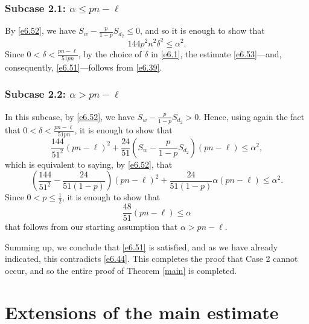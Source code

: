 \documentclass[10pt]{amsart}
\theoremstyle{remark}
\newcommand{\mik}{\leqslant}
\begin{document}
\subsubsection*{Subcase 2.1: $\alpha\mik pn-\ell$} By \eqref{e6.52},
we have $S_w-\frac{p}{1-p}S_{d_2}\mik 0$, and so it is enough to show that
\begin{equation} \label{e6.53}
144p^2n^2\delta^2 \mik \alpha^2.
\end{equation}
Since $0<\delta<\frac{pn-\ell}{51pn}$, by the choice of $\delta$ in \eqref{e6.1},
the estimate \eqref{e6.53}---and, consequently, \eqref{e6.51}---follows from \eqref{e6.39}.

\subsubsection*{Subcase 2.2: $\alpha> pn-\ell$} In this subcase, by \eqref{e6.52}, we have $S_w-\frac{p}{1-p}S_{d_2}>0$.
Hence, using again the fact that $0<\delta<\frac{pn-\ell}{51pn}$, it is enough to show that
\begin{equation} \label{e6.54}
\frac{144}{51^2}(pn-\ell)^2 + \frac{24}{51}\left(S_w-\frac{p}{1-p}S_{d_2}\right)(pn-\ell)\mik \alpha^2,
\end{equation}
which is equivalent to saying, by \eqref{e6.52}, that
\begin{equation} \label{e6.55}
\left(\frac{144}{51^2}-\frac{24}{51(1-p)}\right) (pn-\ell)^2 + \frac{24}{51(1-p)}\alpha (pn-\ell)\mik \alpha^2.
\end{equation}
Since $0<p\mik \frac12$, it is enough to show that
\begin{equation} \label{e6.56}
\frac{48}{51} (pn-\ell)\mik \alpha
\end{equation}
that follows from our starting assumption that $\alpha>pn-\ell$.
\medskip

Summing up, we conclude that \eqref{e6.51} is satisfied, and as we have already indicated, this
contradicts \eqref{e6.44}. This completes the proof that Case 2 cannot occur, and so the entire
proof of Theorem \ref{main} is completed.


\section{Extensions of the main estimate} \label{sec7}

\end{document}
